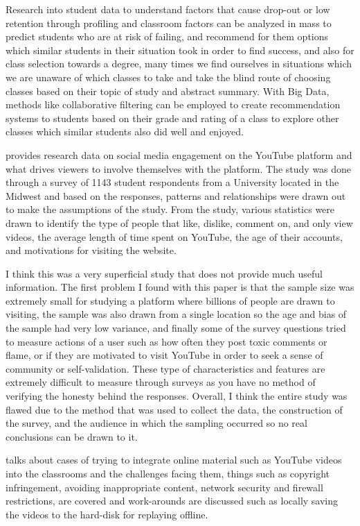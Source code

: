 \documentclass[
	letterpaper, %
]{jdf}
\begin{document}
Research into student data to understand factors that cause drop-out or low retention through profiling and classroom factors can be analyzed in mass to predict students who are at risk of failing, and recommend for them options which similar students in their situation took in order to find success, and also for class selection towards a degree, many times we find ourselves in situations which we are unaware of which classes to take and take the blind route of choosing classes based on their topic of study and abstract summary. With Big Data, methods like collaborative filtering can be employed to create recommendation systems to students based on their grade and rating of a class to explore other classes which similar students also did well and enjoyed. 

\citep{2} provides research data on social media engagement on the YouTube platform and what drives viewers to involve themselves with the platform. The study was done through a survey of 1143 student respondents from a University located in the Midwest and based on the responses, patterns and relationships were drawn out to make the assumptions of the study. From the study, various statistics were drawn to identify the type of people that like, dislike, comment on, and only view videos, the average length of time spent on YouTube, the age of their accounts, and motivations for visiting the website.

I think this was a very superficial study that does not provide much useful information. The first problem I found with this paper is that the sample size was extremely small for studying a platform where billions of people are drawn to visiting, the sample was also drawn from a single location so the age and bias of the sample had very low variance, and finally some of the survey questions tried to measure actions of a user such as how often they post toxic comments or flame, or if they are motivated to visit YouTube in order to seek a sense of community or self-validation. These type of characteristics and features are extremely difficult to measure through surveys as you have no method of verifying the honesty behind the responses. Overall, I think the entire study was flawed due to the method that was used to collect the data, the construction of the survey, and the audience in which the sampling occurred so no real conclusions can be drawn to it.

\citep{3} talks about cases of trying to integrate online material such as YouTube videos into the classrooms and the challenges facing them, things such as copyright infringement, avoiding inappropriate content, network security and firewall restrictions, are covered and work-arounds are discussed such as locally saving the videos to the hard-disk for replaying offline.
\end{document}
